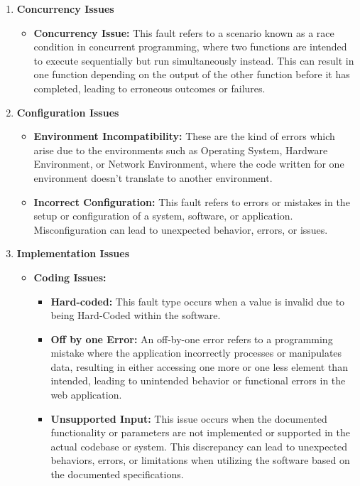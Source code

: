 \documentclass[conference]{IEEEtran}
\begin{document}
\begin{enumerate}
    \item \textbf{Concurrency Issues}
    \begin{itemize}
        \item \textbf{Concurrency Issue:} This fault refers to a scenario known as a race condition in concurrent programming, where two functions are intended to execute sequentially but run simultaneously instead. This can result in one function depending on the output of the other function before it has completed, leading to erroneous outcomes or failures.
    \end{itemize}
    
    \item \textbf{Configuration Issues}
    \begin{itemize}
        \item \textbf{Environment Incompatibility:} These are the kind of errors which arise due to the environments such as Operating System, Hardware Environment, or Network Environment, where the code written for one environment doesn't translate to another environment.
        \item \textbf{Incorrect Configuration:} This fault refers to errors or mistakes in the setup or configuration of a system, software, or application. Misconfiguration can lead to unexpected behavior, errors, or issues.
    \end{itemize}

    \item \textbf{Implementation Issues}
    \begin{itemize}
        \item \textbf{Coding Issues:}
        \begin{itemize}
            \item \textbf{Hard-coded:} This fault type occurs when a value is invalid due to being Hard-Coded within the software.
            \item \textbf{Off by one Error:} An off-by-one error refers to a programming mistake where the application incorrectly processes or manipulates data, resulting in either accessing one more or one less element than intended, leading to unintended behavior or functional errors in the web application.
            \item \textbf{Unsupported Input:} This issue occurs when the documented functionality or parameters are not implemented or supported in the actual codebase or system. This discrepancy can lead to unexpected behaviors, errors, or limitations when utilizing the software based on the documented specifications.
        \end{itemize}


\end{itemize}
\end{enumerate}
\end{document}
